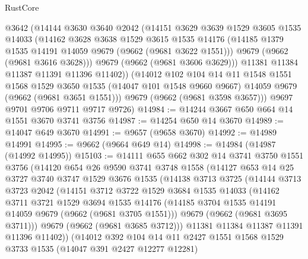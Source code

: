 \begin{lexlean}{RustCore}
\begin{coremodule}
          @3642
          (@14144
            @3630
            @3640
            @2042
            (@14151
              @3629
              @3639
              @1529
              @3605
              @1535
              @14033
              (@14162
                @3628
                @3638
                @1529
                @3615
                @1535
                @14176
                (@14185 @1379 @1535 @14191 @14059 @9679 (@9662 (@9681 @3622 @1551)))
                @9679
                (@9662 (@9681 @3616 @3628)))
              @9679
              (@9662 (@9681 @3606 @3629)))
            @11381
            @11384
            @11387
            @11391
            @11396
            @11402))
        (@14012
          @102
          @104
          @14
          @11
          @1548
          @1551
          @1568
          @1529
          @3650
          @1535
          (@14047 @101 @1548 @9660 @9667)
          @14059
          @9679
          (@9662 (@9681 @3651 @1551)))
        @9679
        (@9662 (@9681 @3598 @3657)))
      @9697
      @9701
      @9706
      @9711
      @9717
      @9726)
@14984 := @14244 @3667 @650 @664 @14 @1551 @3670 @3741 @3756
@14987 := @14254 @650 @14 @3670
@14989 := @14047 @649 @3670
@14991 := @9657 (@9658 @3670)
@14992 := @14989 @14991
@14995 := @9662 (@9664 @649 @14)
@14998 := @14984 (@14987 (@14992 @14995))
@15103 := @14111
    @655
    @662
    @302
    @14
    @3741
    @3750
    @1551
    @3756
    (@14120
      @654
      @26
      @9590
      @3741
      @3748
      @1558
      (@14127
        @653
        @14
        @25
        @3727
        @3740
        @3747
        @1529
        @3676
        @1535
        (@14138
          @3713
          @3725
          (@14144
            @3713
            @3723
            @2042
            (@14151
              @3712
              @3722
              @1529
              @3684
              @1535
              @14033
              (@14162
                @3711
                @3721
                @1529
                @3694
                @1535
                @14176
                (@14185 @3704 @1535 @14191 @14059 @9679 (@9662 (@9681 @3705 @1551)))
                @9679
                (@9662 (@9681 @3695 @3711)))
              @9679
              (@9662 (@9681 @3685 @3712)))
            @11381
            @11384
            @11387
            @11391
            @11396
            @11402))
        (@14012
          @392
          @104
          @14
          @11
          @2427
          @1551
          @1568
          @1529
          @3733
          @1535
          (@14047 @391 @2427 @12277 @12281)

\end{coremodule}
\end{lexlean}
